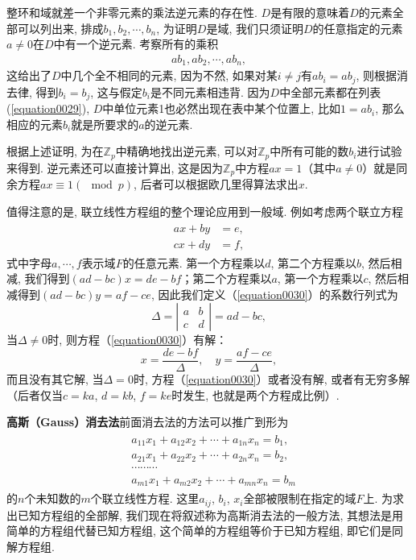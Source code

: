 整环和域就差一个非零元素的乘法逆元素的存在性. $D$是有限的意味着$D$的元素全部可以列出来, 排成$b_1,b_2,\cdots,b_n$, 为证明$D$是域, 我们只须证明$D$的任意指定的元素$a \neq 0$在$D$中有一个逆元素. 考察所有的乘积
\begin{gather}\label{equation0029}
ab_1, ab_2, \cdots, ab_n,
\end{gather}
这给出了$D$中几个全不相同的元素, 因为不然, 如果对某$i \neq j$有$ab_i = ab_j$, 则根据消去律, 得到$b_i=b_j$, 这与假定$b_i$是不同元素相违背. 因为$D$中全部元素都在列表(\ref{equation0029}), $D$中单位元素1也必然出现在表中某个位置上, 比如$1 = ab_i$, 那么相应的元素$b_i$就是所要求的$a$的逆元素. 

根据上述证明, 为在$\mathbb{Z}_p$中精确地找出逆元素, 可以对$\mathbb{Z}_p$中所有可能的数$b_i$进行试验来得到. 逆元素还可以直接计算出, 这是因为$\mathbb{Z}_p$中方程$ax=1$（其中$a \neq 0$）就是同余方程$ax \equiv 1(\mod{p})$, 后者可以根据欧几里得算法求出$x$. 

值得注意的是, 联立线性方程组的整个理论应用到一般域. 例如考虑两个联立方程
\begin{gather} \label{equation0030}
\begin{aligned}
ax+by&=e,\\
cx+dy&=f,
\end{aligned}
\end{gather}
式中字母$a,\cdots,f$表示域$F$的任意元素. 第一个方程乘以$d$, 第二个方程乘以$b$, 然后相减, 我们得到$(ad-bc)x=de-bf$；第二个方程乘以$a$, 第一个方程乘以$c$, 然后相减得到$(ad-bc)y=af-ce$, 因此我们定义（\ref{equation0030}）的系数行列式为
\[
\Delta=\left|\begin{array}{cc}
a & b \\
c & d
\end{array}\right|=ad-bc,
\]
当$\Delta \neq 0$时, 则方程（\ref{equation0030}）有解：
\[
x = \frac{de-bf}{\Delta}, \quad y = \frac{af-ce}{\Delta},
\]
而且没有其它解, 当$\Delta=0$时, 方程（\ref{equation0030}）或者没有解, 或者有无穷多解（后者仅当$c=ka$, $d=kb$, $f=ke$时发生, 也就是两个方程成比例）. 

\textbf{高斯（Gauss）消去法}\quad 前面消去法的方法可以推广到形为
\begin{gather}\label{equation0031}
\begin{aligned}
&a_{11}x_1+a_{12}x_2+\cdots+a_{1n}x_n=b_1,\\
&a_{21}x_1+a_{22}x_2+\cdots+a_{2n}x_n=b_2,\\
&\cdots\cdots\cdots\\
&a_{m1}x_1+a_{m2}x_2+\cdots+a_{mn}x_n=b_m
\end{aligned}
\end{gather}
的$n$个未知数的$m$个联立线性方程. 这里$a_{ij}$, $b_i$, $x_i$全部被限制在指定的域$F$上. 为求出已知方程组的全部解, 我们现在将叙述称为高斯消去法的一般方法, 其想法是用简单的方程组代替已知方程组, 这个简单的方程组等价于已知方程组, 即它们是同解方程组. 

